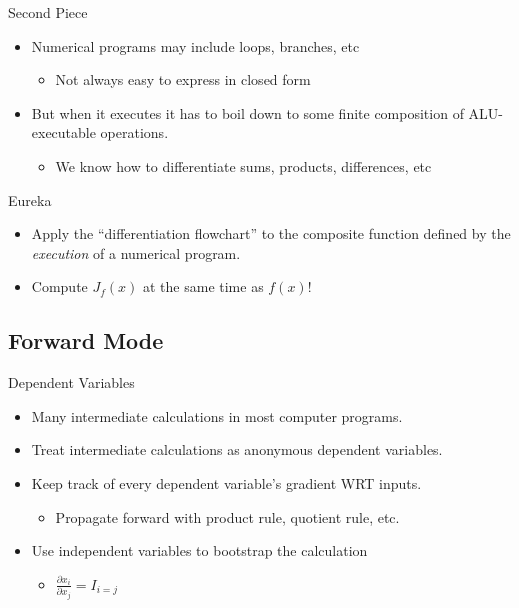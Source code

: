 \documentclass[pdf]{beamer}
\begin{document}
\begin{frame}{Second Piece}
  \begin{itemize}
  \item Numerical programs may include loops, branches, etc
    \begin{itemize}
    \item Not always easy to express in closed form
    \end{itemize}
  \pause
  \item But when it executes it has to boil down to some finite composition of
    ALU-executable operations.
    \begin{itemize}
    \item We know how to differentiate sums, products, differences, etc
    \end{itemize}
  \end{itemize}
\end{frame}

\begin{frame}{Eureka}
  \begin{itemize}
  \item Apply the ``differentiation flowchart'' to the composite function defined by
  the \emph{execution} of a numerical program.
  \pause
  \item Compute $J_f(x)$ at the same time as $f(x)$!
  \end{itemize}
\end{frame}

\subsection{Forward Mode}
\begin{frame}{Dependent Variables}
  \begin{itemize}
  \item Many intermediate calculations in most computer programs.
  \pause
  \item Treat intermediate calculations as anonymous dependent variables.
  \pause
  \item Keep track of every dependent variable's gradient WRT inputs.
    \begin{itemize}
    \item Propagate forward with product rule, quotient rule, etc.
    \end{itemize}
  \pause
  \item Use independent variables to bootstrap the calculation
    \begin{itemize}
    \item $\frac{\partial x_i}{\partial x_j} = I_{i=j}$
    \end{itemize}
  \end{itemize}
\end{frame}
\end{document}
